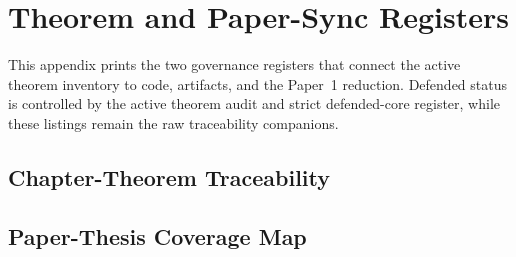 \chapter{Theorem and Paper-Sync Registers}
\label{app:theorem-paper-sync}

This appendix prints the two governance registers that connect the active
theorem inventory to code, artifacts, and the Paper~1 reduction.  Defended
status is controlled by the active theorem audit and strict defended-core
register, while these listings remain the raw traceability companions.

\section{Chapter-Theorem Traceability}



\section{Paper-Thesis Coverage Map}


